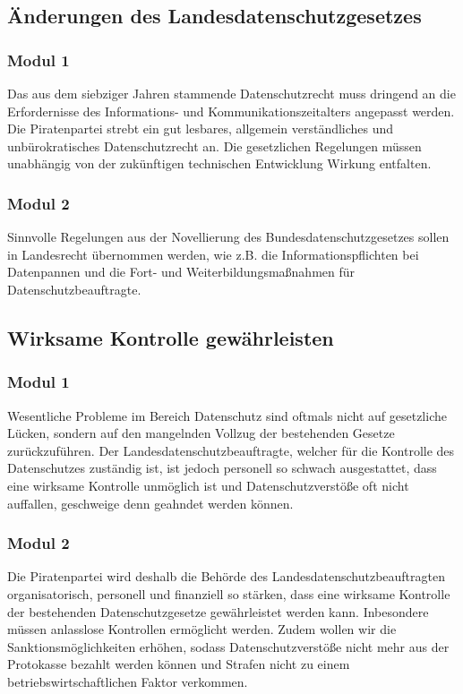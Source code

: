 \subsection*{Änderungen des Landesdatenschutzgesetzes}
\label{datenschutz:lds}

\subsubsection{Modul 1}
\abstimmung
Das aus dem siebziger Jahren stammende Datenschutzrecht muss dringend an die Erfordernisse des Informations- und Kommunikationszeitalters angepasst werden. Die Piratenpartei strebt ein gut lesbares, allgemein verständliches und unbürokratisches Datenschutzrecht an. Die gesetzlichen Regelungen müssen unabhängig von der zukünftigen technischen Entwicklung Wirkung entfalten.

\subsubsection{Modul 2}
\abstimmung
Sinnvolle Regelungen aus der Novellierung des Bundesdatenschutzgesetzes sollen in Landesrecht übernommen werden, wie z.B. die Informationspflichten bei Datenpannen und die Fort- und Weiterbildungsmaßnahmen für Datenschutzbeauftragte.

\subsection*{Wirksame Kontrolle gewährleisten}
\label{datenschutz:kontrolle}

\subsubsection{Modul 1}
\abstimmung
Wesentliche Probleme im Bereich Datenschutz sind oftmals nicht auf gesetzliche Lücken, sondern auf den mangelnden Vollzug der bestehenden Gesetze zurückzuführen. Der Landesdatenschutzbeauftragte, welcher für die Kontrolle des Datenschutzes zuständig ist, ist jedoch personell so schwach ausgestattet, dass eine wirksame Kontrolle unmöglich ist und Datenschutzverstöße oft nicht auffallen, geschweige denn geahndet werden können.

\subsubsection{Modul 2}
\abstimmung
Die Piratenpartei wird deshalb die Behörde des Landesdatenschutzbeauftragten organisatorisch, personell und finanziell so stärken, dass eine wirksame Kontrolle der bestehenden Datenschutzgesetze gewährleistet werden kann. Inbesondere müssen anlasslose Kontrollen ermöglicht werden. Zudem wollen wir die Sanktionsmöglichkeiten erhöhen, sodass Datenschutzverstöße nicht mehr aus der Protokasse bezahlt werden können und Strafen nicht zu einem betriebswirtschaftlichen Faktor verkommen.

